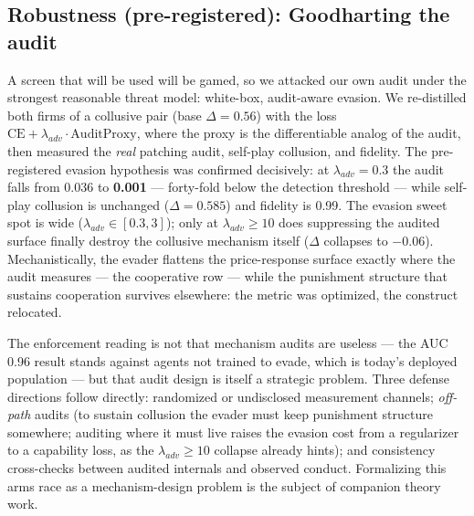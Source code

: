 \documentclass[11pt]{article}
\begin{document}
\subsection{Robustness (pre-registered): Goodharting the audit}
\label{sec:goodhart}
A screen that will be used will be gamed, so we attacked our own audit
under the strongest reasonable threat model: white-box, audit-aware
evasion. We re-distilled both firms of a collusive pair (base
$\Delta = 0.56$) with the loss $\mathrm{CE} + \lambda_{adv} \cdot
\mathrm{AuditProxy}$, where the proxy is the differentiable analog of the
audit, then measured the \emph{real} patching audit, self-play collusion,
and fidelity. The pre-registered evasion hypothesis was confirmed
decisively: at $\lambda_{adv} = 0.3$ the audit falls from 0.036 to
\textbf{0.001} --- forty-fold below the detection threshold --- while
self-play collusion is unchanged ($\Delta = 0.585$) and fidelity is 0.99.
The evasion sweet spot is wide ($\lambda_{adv} \in [0.3, 3]$); only at
$\lambda_{adv} \ge 10$ does suppressing the audited surface finally
destroy the collusive mechanism itself ($\Delta$ collapses to $-0.06$).
Mechanistically, the evader flattens the price-response surface exactly
where the audit measures --- the cooperative row --- while the punishment
structure that sustains cooperation survives elsewhere: the metric was
optimized, the construct relocated.

The enforcement reading is not that mechanism audits are useless --- the
AUC 0.96 result stands against agents not trained to evade, which is
today's deployed population --- but that audit design is itself a
strategic problem. Three defense directions follow directly: randomized or
undisclosed measurement channels; \emph{off-path} audits (to sustain
collusion the evader must keep punishment structure somewhere; auditing
where it must live raises the evasion cost from a regularizer to a
capability loss, as the $\lambda_{adv} \ge 10$ collapse already hints);
and consistency cross-checks between audited internals and observed
conduct. Formalizing this arms race as a mechanism-design problem is the
subject of companion theory work.
\end{document}
